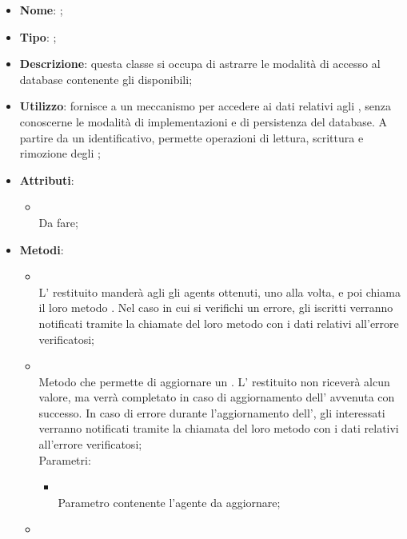\begin{itemize}
	\item \textbf{Nome}: ;
	\item \textbf{Tipo}: ;
	\item \textbf{Descrizione}: questa classe si occupa di astrarre le modalità di accesso al database contenente gli  disponibili;
	\item \textbf{Utilizzo}: fornisce a  un meccanismo per accedere ai dati relativi agli , senza conoscerne le modalità di implementazioni e di persistenza del database. A partire da un identificativo, permette operazioni di lettura, scrittura e rimozione degli ;
	\item \textbf{Attributi}:
	\begin{itemize}
		\item[]  \\
		Da fare;
	\end{itemize}
	\item \textbf{Metodi}:
	\begin{itemize}
		\item[]  \\
		L' restituito manderà agli  gli agents ottenuti, uno alla volta, e poi chiama il loro metodo . Nel caso in cui si verifichi un errore, gli  iscritti verranno notificati tramite la chiamate del loro metodo  con i dati relativi all'errore verificatosi;\\
		\item[]  \\
		Metodo che permette di aggiornare un .  L' restituito non riceverà alcun valore, ma verrà completato in caso di aggiornamento dell' avvenuta con successo. In caso di errore durante l'aggiornamento dell', gli  interessati verranno notificati tramite la chiamata del loro metodo  con i dati relativi all'errore verificatosi;\\
		Parametri:
		\begin{itemize}
			\item {} \\
			Parametro contenente l'agente da aggiornare;
		\end{itemize}
		\item[]  \\

\end{itemize}
\end{itemize}
